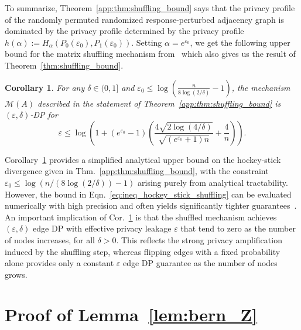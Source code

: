 \documentclass[11pt]{article}
\theoremstyle{plain}
\newtheorem{corollary}{Corollary}[section]
\theoremstyle{definition}
\theoremstyle{remark}
\newcommand{\veps}{{\varepsilon}}
\begin{document}
To summarize, Theorem~\ref{app:thm:shuffling_bound} says that the privacy profile of the randomly permuted randomized response-perturbed adjacency graph is dominated by the privacy profile determined by the privacy profile
$
h(\alpha) := H_{\alpha}\left( P_0\left(\veps_0\right), P_1\left(\veps_0\right) \right).
$
Setting $\alpha = e^{\veps_{0}}$, we get the following upper bound for the matrix shuffling mechanism from~\citep[Thm. 3.2,][]{feldman2023stronger} which also gives us the result of Theorem~\ref{thm:shuffling_bound}.


\begin{corollary} \label{cor:shuffling_bound}
For any $\delta \in (0,1]$ and $\veps_0 \leq \log \left( \frac{n}{8 \log(2 / \delta)} - 1 \right)$, the mechanism $\mathcal{M}(A)$ described in the statement of Theorem~\ref{app:thm:shuffling_bound} is $(\veps,\delta)$-DP for 
\begin{equation} \label{eq:ineq_hockey_stick_shuffling3}
\veps \leq \log \left( 1 + (e^{\veps_0} - 1) \left( \frac{4 \sqrt{2\log(4/\delta)}}{\sqrt{(e^{\veps_0}+1)n}} + \frac{4}{n} \right) \right).
\end{equation}
\end{corollary}



Corollary~\ref{cor:shuffling_bound} provides a simplified analytical upper bound on the hockey-stick divergence given in Thm.~\ref{app:thm:shuffling_bound}, with the constraint $\veps_0 \leq \log(n/(8 \log(2/\delta)) -1)$ arising purely from analytical tractability. However, the bound in Eqn.~\eqref{eq:ineq_hockey_stick_shuffling} can be evaluated numerically with high precision and often yields significantly tighter guarantees~\citep{koskela2023numerical}. 
An important implication of Cor.~\ref{cor:shuffling_bound} is that the shuffled mechanism achieves $(\varepsilon,\delta)$ edge DP with effective privacy leakage $\varepsilon$ that tend to zero as the number of nodes increases, for all $\delta>0$. This reflects the strong privacy amplification induced by the shuffling step, whereas flipping edges with a fixed probability alone provides only a constant $\varepsilon$ edge DP guarantee as the number of nodes grows.




\section{Proof of Lemma~\ref{lem:bern_Z}}
\end{document}
